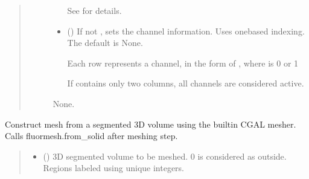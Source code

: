 \documentclass[letterpaper,10pt,english]{sphinxmanual}
\begin{document}
\begin{fulllineitems}
\begin{fulllineitems}
\begin{quote}
\begin{description}
\begin{itemize}
\sphinxAtStartPar
See {\hyperref[\detokenize{_autosummary/nirfasterff.base.optodes.optode:nirfasterff.base.optodes.optode.touch_detectors}]{}} for details.


\item {} 
\sphinxAtStartPar
{} (\sphinxstyleliteralemphasis{\sphinxupquote{, }}) \textendash{} 
\sphinxAtStartPar
If not , sets the channel information. Uses one\sphinxhyphen{}based indexing. The default is None.

\sphinxAtStartPar
Each row represents a channel, in the form of , where  is 0 or 1

\sphinxAtStartPar
If  contains only two columns, all channels are considered active.


\end{itemize}

\sphinxAtStartPar
None.

\end{description}\end{quote}

\end{fulllineitems}


\begin{fulllineitems}
\label{\detokenize{_autosummary/nirfasterff.base.fluor_mesh.fluormesh:nirfasterff.base.fluor_mesh.fluormesh.from_volume}}
\pysigstartsignatures
{}
\pysigstopsignatures
\sphinxAtStartPar
Construct mesh from a segmented 3D volume using the built\sphinxhyphen{}in CGAL mesher. Calls fluormesh.from\_solid after meshing step.
\begin{quote}\begin{description}
\begin{itemize}
\item {} 
\sphinxAtStartPar
{} () \textendash{} 3D segmented volume to be meshed. 0 is considered as outside. Regions labeled using unique integers.


\end{itemize}
\end{description}
\end{quote}
\end{fulllineitems}
\end{fulllineitems}
\end{document}

